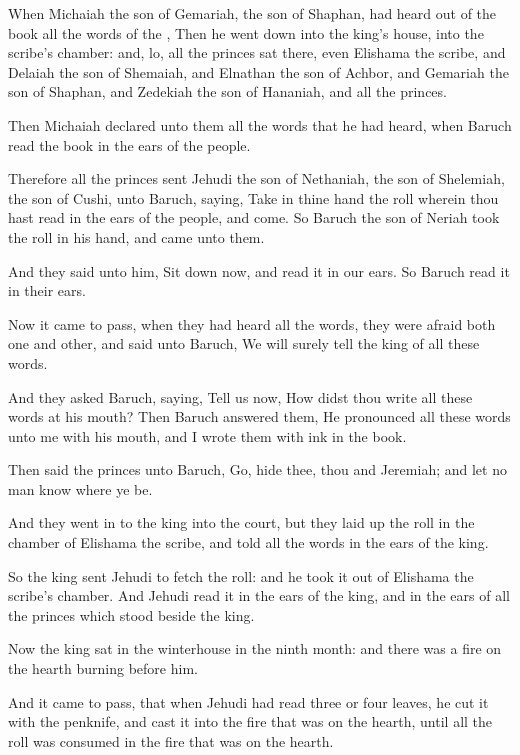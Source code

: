 \Verse When Michaiah the son of Gemariah, the son of Shaphan, had heard out of the book all the words of the \LORD, \Verse Then he went down into the king's house, into the scribe's chamber: and, lo, all the princes sat there, even Elishama the scribe, and Delaiah the son of Shemaiah, and Elnathan the son of Achbor, and Gemariah the son of Shaphan, and Zedekiah the son of Hananiah, and all the princes.

\Verse Then Michaiah declared unto them all the words that he had heard, when Baruch read the book in the ears of the people.

\Verse Therefore all the princes sent Jehudi the son of Nethaniah, the son of Shelemiah, the son of Cushi, unto Baruch, saying, Take in thine hand the roll wherein thou hast read in the ears of the people, and come. So Baruch the son of Neriah took the roll in his hand, and came unto them.

\Verse And they said unto him, Sit down now, and read it in our ears.  So Baruch read it in their ears.

\Verse Now it came to pass, when they had heard all the words, they were afraid both one and other, and said unto Baruch, We will surely tell the king of all these words.

\Verse And they asked Baruch, saying, Tell us now, How didst thou write all these words at his mouth?  \Verse Then Baruch answered them, He pronounced all these words unto me with his mouth, and I wrote them with ink in the book.

\Verse Then said the princes unto Baruch, Go, hide thee, thou and Jeremiah; and let no man know where ye be.

\Verse And they went in to the king into the court, but they laid up the roll in the chamber of Elishama the scribe, and told all the words in the ears of the king.

\Verse So the king sent Jehudi to fetch the roll: and he took it out of Elishama the scribe's chamber. And Jehudi read it in the ears of the king, and in the ears of all the princes which stood beside the king.

\Verse Now the king sat in the winterhouse in the ninth month: and there was a fire on the hearth burning before him.

\Verse And it came to pass, that when Jehudi had read three or four leaves, he cut it with the penknife, and cast it into the fire that was on the hearth, until all the roll was consumed in the fire that was on the hearth.

